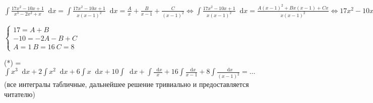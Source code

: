 \documentclass{article}
\newcommand*\diff{\mathop{}\!\mathrm{d}}
\begin{document}
\hfill

$\int \frac{17x^2 - 10 x + 1}{x^3 - 2x^2 + x} \diff x = \int \frac{17x^2 - 10 x + 1}{x(x - 1)^2} \diff x = \frac{A}{x} + \frac{B}{x - 1} + \frac{C}{(x - 1)^2} \Longleftrightarrow \int \frac{17x^2 - 10 x + 1}{x(x - 1)^2} \diff x = \frac{A(x-1)^2 + Bx(x-1) + Cx}{x(x-1)^2} \Longleftrightarrow 17x^2 - 10x + 1 = Ax^2 - 2A x + A + B x^2 - B x + C x$

$\begin{cases}
    17 = A + B \\
    -10 = -2A - B + C \\
    A = 1 \ B = 16 \ C = 8
\end{cases}$

\hfill

\hfill

(*) = $\int x^3 \diff x + 2 \int x^2 \diff x + 6 \int x \diff x + 10 \int \diff x + \int \frac{\diff x}{x} + 16 \int \frac{\diff x}{x - 1} + 8 \int \frac{\diff x}{(x - 1)^2} = \dots$ (все интегралы табличные, дальнейшее решение тривиально и предоставляется читателю)
\end{document}
